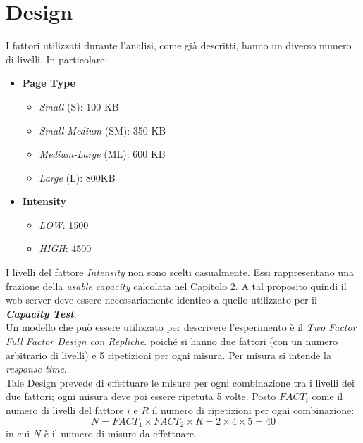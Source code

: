\section{Design}
I fattori utilizzati durante l'analisi, come già descritti, hanno un diverso numero di livelli. In particolare:
\begin{itemize}
	\item \textbf{Page Type}
	\begin{itemize}
		\item \textit{Small}        (S):  100 KB
		\item \textit{Small-Medium} (SM): 350 KB
		\item \textit{Medium-Large} (ML): 600 KB
		\item \textit{Large}        (L):  800KB
	\end{itemize}
	\item \textbf{Intensity}
	\begin{itemize}
		\item \textit{LOW}: 1500
		\item \textit{HIGH}: 4500
	\end{itemize}
\end{itemize}
I livelli del fattore \textit{Intensity} non sono scelti casualmente. Essi rappresentano una frazione della \textit{usable capacity} calcolata nel Capitolo 2. A tal proposito quindi il web server deve essere necessariamente identico a quello utilizzato per il \textit{\textbf{Capacity Test}}.
\\Un modello che può essere utilizzato per descrivere l'esperimento è il \textit{Two Factor Full Factor Design con Repliche}. poiché si hanno due fattori (con un numero arbitrario di livelli) e 5 ripetizioni per ogni misura. Per misura si intende la \textit{response time}.
\\Tale Design prevede di effettuare le misure per ogni combinazione tra i livelli dei due fattori; ogni misura deve poi essere ripetuta 5 volte. Posto $FACT_i$ come il numero di livelli del fattore $i$ e $R$ il numero di ripetizioni per ogni combinazione:
\begin{equation*}
	N = FACT_1 \times FACT_2 \times R = 2\times 4 \times 5 = 40
\end{equation*}
in cui $N$ è il numero di misure da effettuare.



